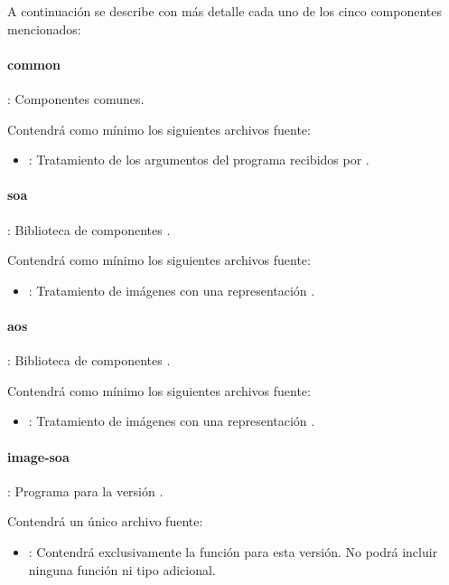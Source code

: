 A continuación se describe con más detalle cada uno de los cinco componentes mencionados:

\paragraph{common}: Componentes comunes.

Contendrá como mínimo los siguientes archivos fuente:
\begin{itemize}
  \item {}: Tratamiento de los argumentos del
        programa recibidos por .
\end{itemize}

\paragraph{soa}: Biblioteca de componentes .

Contendrá como mínimo los siguientes archivos fuente:
\begin{itemize}
  \item {}: Tratamiento de imágenes
        con una representación .
\end{itemize}

\paragraph{aos}: Biblioteca de componentes .

Contendrá como mínimo los siguientes archivos fuente:

\begin{itemize}
  \item {}: Tratamiento de imágenes
        con una representación .
\end{itemize}

\paragraph{image-soa}: Programa para la versión .

Contendrá un único archivo fuente:
\begin{itemize}
  \item {}: Contendrá exclusivamente la función
         para esta versión.
        No podrá incluir ninguna función ni tipo adicional.
\end{itemize}

